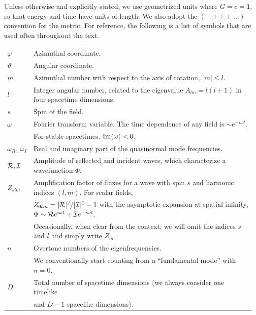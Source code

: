 \documentclass[11pt]{article}
\numberwithin{equation}{section} %
\begin{document}
Unless otherwise and explicitly stated, we use geometrized units where
$G=c=1$, so that energy and time have units of length. We also adopt the
$(-+++\dots)$ convention for the metric.  For reference, the following is a list of
symbols that are used often throughout the text.

\begin{table}[ht]
\begin{tabular}{ll}
  $\varphi$             & Azimuthal coordinate.\\
  $\vartheta$           & Angular coordinate.\\
  $m$                   & Azimuthal number with respect to the axis of rotation, $|m|\leq l$.\\ 
  $l$                   & Integer angular number, related to the eigenvalue $A_{lm}=l(l+1)$ in four spacetime dimensions.\\ 
  $s$                   & Spin of the field.\\
  $\omega$              & Fourier transform variable. The time dependence of any field is $\sim e^{-i\omega t}$.  \\
                        & For stable spacetimes, ${\rm Im}(\omega)<0$. \\
  $\omega_R,\,\omega_I$ & Real and imaginary part of the quasinormal mode frequencies.\\
  ${\cal R}, {\cal I}$  & Amplitude of reflected and incident waves, which characterize a wavefunction $\Phi$. \\
  $Z_{slm}$             & Amplification factor of fluxes for a wave with spin $s$ and harmonic indices $(l,m)$. For scalar fields,\\
                        & $Z_{0lm}=|{\cal R}|^2/|{\cal I}|^2-1$ with the asymptotic expansion at spatial infinity, $\Phi\sim {\cal R}e^{i\omega t}+{\cal I}e^{-i\omega t}$.\\
                        & Occasionally, when clear from the context, we will omit the indices $s$ and $l$ and simply write $Z_{m}$.\\
  $n$                   & Overtone numbers of the eigenfrequencies.\\
                        & We conventionally start counting from a ``fundamental mode'' with $n=0$.\\
  $D$                   & Total number of spacetime dimensions (we always consider one timelike\\
                        & and $D-1$ spacelike dimensions).\\

\end{tabular}
\end{table}
\end{document}
